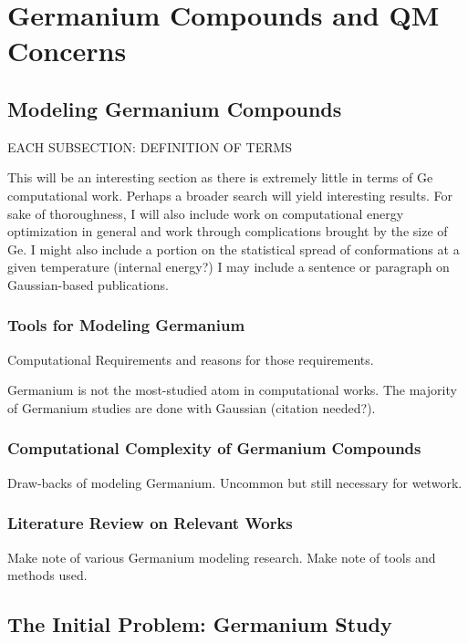 \chapter{Germanium Compounds and QM Concerns}
\label{ch:Germanium}

\section{Modeling Germanium Compounds}

EACH SUBSECTION: DEFINITION OF TERMS

This will be an interesting section as there is extremely little in terms of Ge computational work. Perhaps a broader search will yield interesting results. For sake of thoroughness, I will also include work on computational energy optimization in general and work through complications brought by the size of Ge. I might also include a portion on the statistical spread of conformations at a given temperature (internal energy?) I may include a sentence or paragraph on Gaussian-based publications. 

\subsection{Tools for Modeling Germanium}

Computational Requirements and reasons for those requirements.

Germanium is not the most-studied atom in computational works.
The majority of Germanium studies are done with Gaussian (citation needed?).

\subsection{Computational Complexity of Germanium Compounds}

Draw-backs of modeling Germanium. Uncommon but still necessary for wetwork.

\subsection{Literature Review on Relevant Works}

Make note of various Germanium modeling research. Make note of tools and methods used.









\section{The Initial Problem: Germanium Study}

